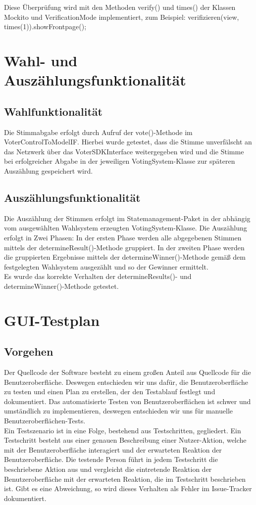 \documentclass[parskip=full]{scrartcl}
\begin{document}
Diese Überprüfung wird mit den Methoden verify() und times() der Klassen Mockito und VerificationMode implementiert, zum Beispiel: 
verifizieren(view, times(1)).showFrontpage();

\section{Wahl- und Auszählungsfunktionalität}
\subsection{Wahlfunktionalität}
Die Stimmabgabe erfolgt durch Aufruf der vote()-Methode im VoterControlToModelIF.
Hierbei wurde getestet, dass die Stimme unverfälscht an das Netzwerk über das VoterSDKInterface weitergegeben wird und die Stimme bei erfolgreicher Abgabe in der jeweiligen VotingSystem-Klasse zur späteren Auszählung gespeichert wird.


\subsection{Auszählungsfunktionalität}
Die Auszählung der Stimmen erfolgt im Statemanagement-Paket in der abhängig vom ausgewählten Wahlsystem erzeugten VotingSystem-Klasse.
Die Auszählung erfolgt in Zwei Phasen: In der ersten Phase werden alle abgegebenen Stimmen mittels der determineResult()-Methode gruppiert.
In der zweiten Phase werden die gruppierten Ergebnisse mittels der determineWinner()-Methode gemäß dem festgelegten Wahlsystem ausgezählt und so der Gewinner ermittelt.\\
Es wurde das korrekte Verhalten der determineResults()- und determineWinner()-Methode getestet.

\section{GUI-Testplan}
\subsection{Vorgehen}
Der Quellcode der Software besteht zu einem großen Anteil aus Quellcode für die Benutzeroberfläche. Deswegen entschieden wir uns dafür, die Benutzeroberfläche zu testen und einen Plan zu erstellen, der den Testablauf festlegt und dokumentiert. Das automatisierte Testen von Benutzeroberflächen ist schwer und umständlich zu implementieren, deswegen entschieden wir uns für manuelle Benutzeroberflächen-Tests.
\\
Ein Testszenario ist in eine Folge, bestehend aus Testschritten, gegliedert. Ein Testschritt besteht aus einer genauen Beschreibung einer Nutzer-Aktion, welche mit der Benutzeroberfläche interagiert und der erwarteten Reaktion der Benutzeroberfläche. Die testende Person führt in jedem Testschritt die beschriebene Aktion aus und vergleicht die eintretende Reaktion der Benutzeroberfläche mit der erwarteten Reaktion, die im Testschritt beschrieben ist. Gibt es eine Abweichung, so wird dieses Verhalten als Fehler im Issue-Tracker dokumentiert.
\end{document}
